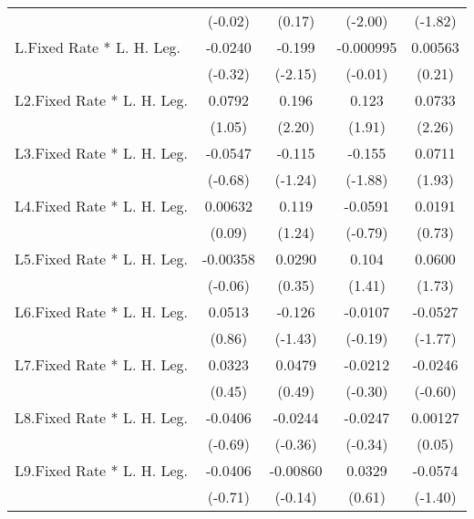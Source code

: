 {\begin{longtable}{l*{4}{c}}
                &  (-0.02)         &   (0.17)         &  (-2.00)         &  (-1.82)         \\
[1em]
L.Fixed Rate * L. H. Leg.&  -0.0240         &   -0.199\sym{*}  &-0.000995         &  0.00563         \\
                &  (-0.32)         &  (-2.15)         &  (-0.01)         &   (0.21)         \\
[1em]
L2.Fixed Rate * L. H. Leg.&   0.0792         &    0.196\sym{*}  &    0.123         &   0.0733\sym{*}  \\
                &   (1.05)         &   (2.20)         &   (1.91)         &   (2.26)         \\
[1em]
L3.Fixed Rate * L. H. Leg.&  -0.0547         &   -0.115         &   -0.155         &   0.0711         \\
                &  (-0.68)         &  (-1.24)         &  (-1.88)         &   (1.93)         \\
[1em]
L4.Fixed Rate * L. H. Leg.&  0.00632         &    0.119         &  -0.0591         &   0.0191         \\
                &   (0.09)         &   (1.24)         &  (-0.79)         &   (0.73)         \\
[1em]
L5.Fixed Rate * L. H. Leg.& -0.00358         &   0.0290         &    0.104         &   0.0600         \\
                &  (-0.06)         &   (0.35)         &   (1.41)         &   (1.73)         \\
[1em]
L6.Fixed Rate * L. H. Leg.&   0.0513         &   -0.126         &  -0.0107         &  -0.0527         \\
                &   (0.86)         &  (-1.43)         &  (-0.19)         &  (-1.77)         \\
[1em]
L7.Fixed Rate * L. H. Leg.&   0.0323         &   0.0479         &  -0.0212         &  -0.0246         \\
                &   (0.45)         &   (0.49)         &  (-0.30)         &  (-0.60)         \\
[1em]
L8.Fixed Rate * L. H. Leg.&  -0.0406         &  -0.0244         &  -0.0247         &  0.00127         \\
                &  (-0.69)         &  (-0.36)         &  (-0.34)         &   (0.05)         \\
[1em]
L9.Fixed Rate * L. H. Leg.&  -0.0406         & -0.00860         &   0.0329         &  -0.0574         \\
                &  (-0.71)         &  (-0.14)         &   (0.61)         &  (-1.40)         \\

\end{longtable}}
